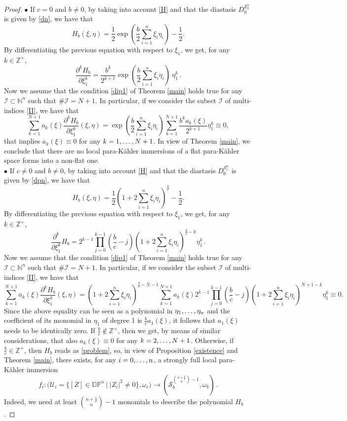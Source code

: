 \documentclass{article}
\newcommand{\I}{\mathcal{I}}
\newcommand{\de}{\partial}
\newcommand{\s}{\mathcal{S}}
\newcommand{\pk}{para-K\"ahler }
\newcommand{\Z}{\mathds{Z}}
\newcommand{\N}{\mathds{N}}
\newcommand{\DP}{\mathds{D}\mathds{P}}
\begin{document}
\begin{proof}
\medskip
\noindent
$\bullet$ 
If $c=0$ and $b\neq 0$, by taking into account   \eqref{H} and that the diastasis $D_0^{\s_0^n}$ is given by \eqref{dn}, we have that
$$ H_b(\xi,\eta)= \frac{1}{2}\exp\left( \frac{b}{2}\sum_{i=1}^n \xi_i\eta_i \right)-\frac{1}{2}.$$
By differentiating the previous equation with respect to  $\xi_1$, we get, for any $k\in\Z^+$,
$$\frac{\de^k H_b}{\de \xi_1^{k}}=\frac{b^k}{2^{k+1}}\exp\left( \frac{b}{2}\sum_{i=1}^n \xi_i\eta_i \right)\ \eta_1^k\,. $$
Now we assume that the condition \eqref{dip1} of Theorem \ref{main} holds true for any  $\I\subset \N^n$ such that $\#\I=N+1$. In particular, if we consider the subset $\I$ of multi-indices \eqref{II}, we have that
$$\sum_{k=1}^{N+1} a_k(\xi) \frac{\de^k H_b}{\de \xi_1^{k}}(\xi,\eta)= \exp\left( \frac{b}{2}\sum_{i=1}^n \xi_i\eta_i \right) \sum_{k=1}^{N+1}\frac{b^k  a_k(\xi) }{2^{k+1}} \eta_1^k \equiv 0,$$
that implies $a_k(\xi)\equiv 0$ for any  $k=1,\mathellipsis,N+1$.
In view of  Theorem  \ref{main}, we  conclude that there are no local \pk immersions of a flat \pk space forms into a non-flat one.\\


\medskip
\noindent
$\bullet$ 
If $c\neq 0$ and $b\neq 0$, by taking into account   \eqref{H} and that the diastasis $D_0^{\s_c^n}$ is given by \eqref{dpn}, we have that
$$ H_b(\xi,\eta)= \frac{1}{2}\left(1+2\sum_{i=1}^n \xi_i\eta_i\right)^\frac{b}{c}-\frac{1}{2}.$$
By differentiating the previous equation with respect to  $\xi_1$, we get, for any $k\in\Z^+$,
$$\frac{\de^k}{\de \xi_1^{k}} H_b= 
2^{k-1} \prod_{j=0}^{k-1}\left(\frac{b}{c}-j\right)\left(1+2\sum_{i=1}^n \xi_i\eta_i\right)^{\frac{b}{c} -k}\eta_1^k\,.$$
Now we assume that the condition \eqref{dip1} of Theorem \ref{main} holds true for any  $\I\subset \N^n$ such that $\#\I=N+1$. In particular, if we consider the subset $\I$ of multi-indices \eqref{II}, we have that
$$\sum_{k=1}^{N+1} a_k(\xi) \frac{\de^k H_b}{\de \xi_1^{k}}(\xi,\eta)=\left(1+2\sum_{i=1}^n \xi_i\eta_i\right)^{\frac{b}{c} -N-1}
\sum_{k=1}^{N+1} a_k(\xi) 2^{k-1} \prod_{j=0}^{k-1}\left(\frac{b}{c}-j\right)\left(1+2\sum_{i=1}^n \xi_i\eta_i\right)^{N+1 -k}\eta_1^k \equiv 0.$$
Since the above equality can be seen as a polynomial in $\eta_1,\mathellipsis,\eta_n$ and the coefficient of its monomial in $\eta_1$ of degree 1 is $\frac{b}{c}a_1(\xi)$, it follows that $a_1(\xi)$ needs to be identically zero.
If $\frac{b}{c}\not\in\Z^+$, then we get, by means of similar considerations, that also $a_k(\xi)\equiv 0$ for any  $k=2,\mathellipsis,N+1$. Otherwise, if $\frac{b}{c}\in\Z^+$, then $H_b$ reads as \eqref{problem}, so, in view of Proposition \ref{existence} and Theorem \ref{main}, there exists, for any $i=0,\mathellipsis,n$,
a strongly full local \pk immersion 
$$f_i:\big( \mathcal{U}_i=\{[Z]\in\DP^n\ | \ |Z_i|^2\neq0\},\omega_c\big) \to \left(\s_b^{\binom{n+\frac{b}{c}}{n}-1},\omega_b\right)\,.$$
Indeed, we need at least $\binom{n+\frac{b}{c}}{n}-1$ monomials to describe the polynomial $H_b$.


\end{proof}
\end{document}
